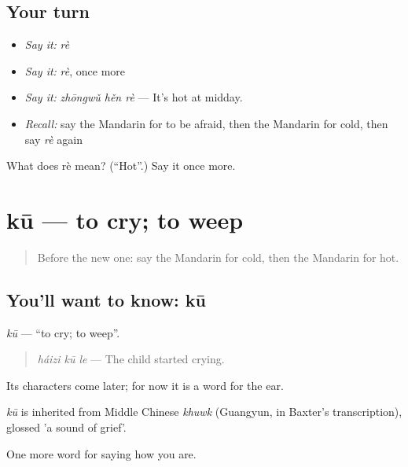 \subsection*{Your turn}
\begin{itemize}
\raggedright
  \item \emph{Say it:} \emph{rè}
  \item \emph{Say it:} \emph{rè}, once more
  \item \emph{Say it:} \emph{zhōngwǔ hěn rè} — It's hot at midday.
  \item \emph{Recall:} say the Mandarin for to be afraid, then the Mandarin for cold, then say \emph{rè} again
\end{itemize}

\begin{tcolorbox}[breakable,colback=teal!4,colframe=teal!35!black,title={Before you move on}]
What does rè mean? (\textquotedblleft{}Hot\textquotedblright{}.) Say it once more.
\end{tcolorbox}
\section[kū]{kū — to cry; to weep}

\label{lesson:ZH-C51-ku}



\begin{quote}
Before the new one: say the Mandarin for cold, then the Mandarin for hot.
\end{quote}

\subsection*{You'll want to know: kū}
\emph{kū} — \textquotedblleft{}to cry; to weep\textquotedblright{}.

\begin{quote}
\emph{háizi kū le} — The child started crying.
\end{quote}

Its characters come later; for now it is a word for the ear.

\begin{cousinweb}
\emph{kū} is inherited from Middle Chinese \emph{khuwk} (Guangyun, in Baxter's transcription), glossed 'a sound of grief'.
\end{cousinweb}

\begin{grammarlens}[title={What you've built}]
One more word for saying how you are.
\end{grammarlens}

